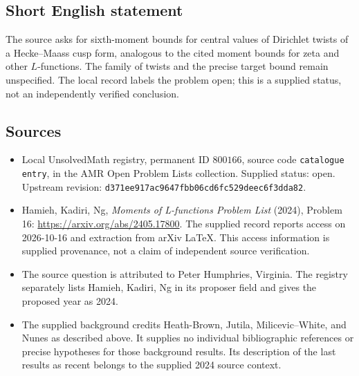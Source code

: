 \documentclass[11pt]{article}
\begin{document}
\subsection{Short English statement}
The source asks for sixth-moment bounds for central values of Dirichlet twists of a Hecke--Maass cusp form, analogous to the cited moment bounds for zeta and other \(L\)-functions. The family of twists and the precise target bound remain unspecified. The local record labels the problem open; this is a supplied status, not an independently verified conclusion.
\subsection{Sources}
\begin{itemize}
\item Local UnsolvedMath registry, permanent ID \(800166\), source code \texttt{catalogue entry}, in the AMR Open Problem Lists collection. Supplied status: open. Upstream revision: \texttt{d371ee917ac9647fbb06cd6fc529deec6f3dda82}.
\item Hamieh, Kadiri, Ng, \emph{Moments of L-functions Problem List} (2024), Problem 16: \url{https://arxiv.org/abs/2405.17800}. The supplied record reports access on 2026-10-16 and extraction from arXiv LaTeX. This access information is supplied provenance, not a claim of independent source verification.
\item The source question is attributed to Peter Humphries, Virginia. The registry separately lists Hamieh, Kadiri, Ng in its proposer field and gives the proposed year as 2024.
\item The supplied background credits Heath-Brown, Jutila, Milicevic--White, and Nunes as described above. It supplies no individual bibliographic references or precise hypotheses for those background results. Its description of the last results as recent belongs to the supplied 2024 source context.
\end{itemize}
\end{document}
